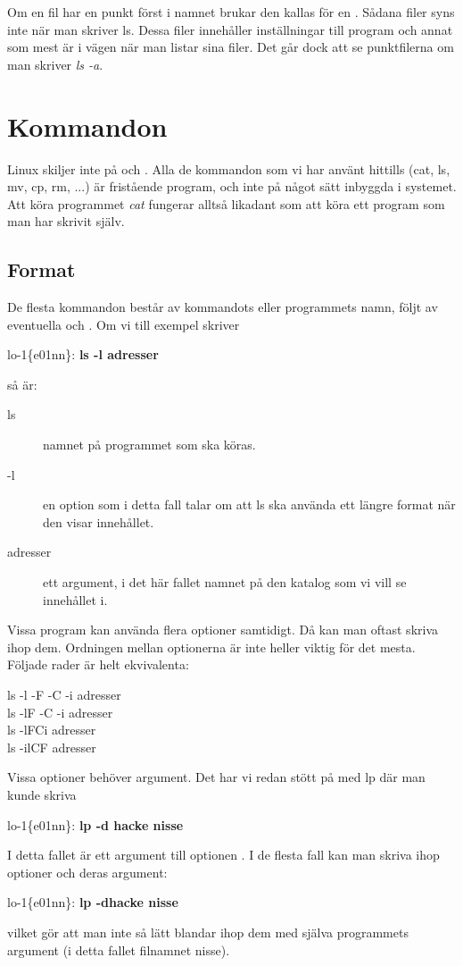 \documentclass[a4paper,twocolumn]{book}
\begin{document}
Om en fil har en punkt först i namnet brukar den kallas för en
. Sådana filer syns inte när man skriver
ls. Dessa filer innehåller inställningar till program och annat som
mest är i vägen när man listar sina filer. Det går dock att se
punktfilerna om man skriver \emph{ls -a}.
\section{Kommandon}

Linux skiljer inte på  och
. Alla de kommandon som vi har
använt hittills (cat, ls, mv, cp, rm, ...) är fristående program, och
inte på något sätt inbyggda i systemet. Att köra programmet \emph{cat}
fungerar alltså likadant som att köra ett program som man har skrivit
själv. 

\subsection{Format}

De flesta kommandon består av kommandots eller programmets namn, följt
av eventuella  och . Om vi till
exempel skriver
\begin{example}
lo-1\{e01nn\}: \textbf{ls -l adresser}
\end{example}
så är:
\begin{description}
\item[ls] namnet på programmet som ska köras.
\item[-l] en option som i detta fall talar om att ls ska använda ett
  längre format när den visar innehållet.
\item[adresser] ett argument, i det här fallet namnet på den katalog
  som vi vill se innehållet i.
\end{description}

Vissa program kan använda flera optioner samtidigt. Då kan man oftast
skriva ihop dem. Ordningen mellan optionerna är inte heller viktig för
det mesta. Följade rader är helt ekvivalenta:
\begin{ttquote}
  ls -l -F -C -i adresser \\
  ls -lF -C -i adresser \\
  ls -lFCi adresser \\
  ls -ilCF adresser 
\end{ttquote}
Vissa optioner behöver argument. Det har vi redan stött på med lp där
man kunde skriva
\begin{example}
lo-1\{e01nn\}: \textbf{lp -d hacke nisse}
\end{example}
I detta fallet är  ett argument till optionen . I de
flesta fall kan man skriva ihop optioner och deras argument:
\begin{example}
lo-1\{e01nn\}: \textbf{lp -dhacke nisse}
\end{example}
vilket gör att man inte så lätt blandar ihop dem med själva
programmets argument (i detta fallet filnamnet nisse).
\end{document}

